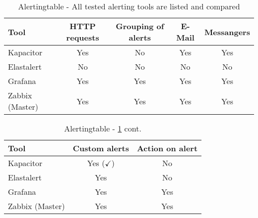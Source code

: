 \begin{table}
	\centering
	
	\begin{tabular}{lcccc}
		\hline
Tool & HTTP requests & Grouping of alerts         & E-Mail                      & Messangers \\
\hline
Kapacitor                    & Yes           & No & Yes                         & Yes \\
Elastalert & No & No & No & No \\
Grafana                      & Yes           & Yes                        & Yes & Yes \\
Zabbix (Master)              & Yes           & Yes                        & Yes                         & Yes \\
		\hline
	\end{tabular}
	\caption{Alertingtable - All tested alerting tools are listed and compared}
	\label{tab:Alerting}
\end{table}

\begin{table}
	\centering
	\begin{tabular}{lcc}
		\hline
		Tool & Custom alerts & Action on alert \\
		\hline
		Kapacitor                    & Yes ($ \checkmark $)       & No              \\
		Elastalert                   & Yes           & No              \\
		Grafana                      & Yes           & Yes             \\
		Zabbix (Master)              & Yes           & Yes           \\
		\hline 
	\end{tabular}
	\caption{Alertingtable - \cref{tab:Alerting} cont.}
	\label{tab:Alertingcont}
\end{table}